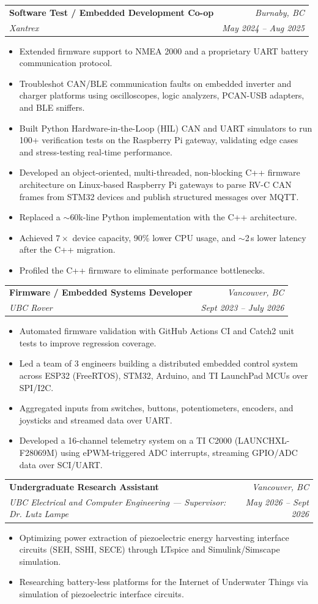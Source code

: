 \documentclass[letterpaper,11pt]{article}
\makeatletter
\newcommand{\resumeItem}[1]{
  \item\small{
    {#1 \vspace{-2pt}}
  }
}
\newcommand{\resumeSubheading}[4]{
  \vspace{-2pt}\item
    \begin{tabular*}{0.97\textwidth}[t]{l@{\extracolsep{\fill}}r}
      \textbf{#1} & \textit{\small #4} \\
      \textit{\small#3} & \textit{\small #2} \\
    \end{tabular*}\vspace{-7pt}
}
\newcommand{\resumeItemListStart}{\begin{itemize}[leftmargin=0.2in]}
\newcommand{\resumeItemListEnd}{\end{itemize}\vspace{-5pt}}
\makeatother
\begin{document}
\resumeSubheading
      {Software Test / Embedded Development Co-op}{May 2024 -- Aug 2025}
      {Xantrex}{Burnaby, BC}
      \resumeItemListStart
        \resumeItem{Extended firmware support to NMEA 2000 and a proprietary UART battery communication protocol.}
        \resumeItem{Troubleshot CAN/BLE communication faults on embedded inverter and charger platforms using oscilloscopes, logic analyzers, PCAN-USB adapters, and BLE sniffers.}
        \resumeItem{Built Python Hardware-in-the-Loop (HIL) CAN and UART simulators to run 100+ verification tests on the Raspberry Pi gateway, validating edge cases and stress-testing real-time performance.}
        \resumeItem{Developed an object-oriented, multi-threaded, non-blocking C++ firmware architecture on Linux-based Raspberry Pi gateways to parse RV-C CAN frames from STM32 devices and publish structured messages over MQTT.}
        \resumeItem{Replaced a $\sim$60k-line Python implementation with the C++ architecture.}
        \resumeItem{Achieved $7\times$ device capacity, 90\% lower CPU usage, and $\sim$2\,s lower latency after the C++ migration.}
        \resumeItem{Profiled the C++ firmware to eliminate performance bottlenecks.}
      \resumeItemListEnd

    \resumeSubheading
      {Firmware / Embedded Systems Developer}{Sept 2023 -- July 2026}
      {UBC Rover}{Vancouver, BC}
      \resumeItemListStart
        \resumeItem{Automated firmware validation with GitHub Actions CI and Catch2 unit tests to improve regression coverage.}
        \resumeItem{Led a team of 3 engineers building a distributed embedded control system across ESP32 (FreeRTOS), STM32, Arduino, and TI LaunchPad MCUs over SPI/I2C.}
        \resumeItem{Aggregated inputs from switches, buttons, potentiometers, encoders, and joysticks and streamed data over UART.}
        \resumeItem{Developed a 16-channel telemetry system on a TI C2000 (LAUNCHXL-F28069M) using ePWM-triggered ADC interrupts, streaming GPIO/ADC data over SCI/UART.}
      \resumeItemListEnd

    \resumeSubheading
      {Undergraduate Research Assistant}{May 2026 -- Sept 2026}
      {UBC Electrical and Computer Engineering --- Supervisor: Dr. Lutz Lampe}{Vancouver, BC}
      \resumeItemListStart
        \resumeItem{Optimizing power extraction of piezoelectric energy harvesting interface circuits (SEH, SSHI, SECE) through LTspice and Simulink/Simscape simulation.}
        \resumeItem{Researching battery-less platforms for the Internet of Underwater Things via simulation of piezoelectric interface circuits.}
      \resumeItemListEnd
\end{document}
